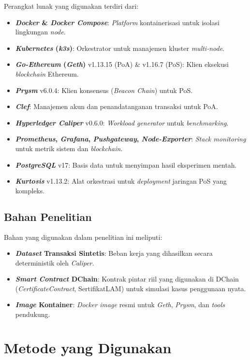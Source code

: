 Perangkat lunak yang digunakan terdiri dari:
\begin{itemize}
    \item \textbf{\textit{Docker} \& \textit{Docker Compose}}: \textit{Platform} kontainerisasi untuk isolasi lingkungan \textit{node}.
    \item \textbf{\textit{Kubernetes} (\textit{k3s})}: Orkestrator untuk manajemen kluster \textit{multi-node}.
    \item \textbf{\textit{Go-Ethereum} (\textit{Geth})} v1.13.15 (PoA) \& v1.16.7 (PoS): Klien eksekusi \textit{blockchain} Ethereum.
    \item \textbf{\textit{Prysm}} v6.0.4: Klien konsensus (\textit{Beacon Chain}) untuk PoS.
    \item \textbf{\textit{Clef}}: Manajemen akun dan penandatanganan transaksi untuk PoA.
    \item \textbf{\textit{Hyperledger Caliper}} v0.6.0: \textit{Workload generator} untuk \textit{benchmarking}.
    \item \textbf{\textit{Prometheus}, \textit{Grafana}, \textit{Pushgateway}, \textit{Node-Exporter}}: \textit{Stack monitoring} untuk metrik sistem dan \textit{blockchain}.
    \item \textbf{\textit{PostgreSQL}} v17: Basis data untuk menyimpan hasil eksperimen mentah.
    \item \textbf{\textit{Kurtosis}} v1.13.2: Alat orkestrasi untuk \textit{deployment} jaringan PoS yang kompleks.
\end{itemize}

\subsection{Bahan Penelitian}
Bahan yang digunakan dalam penelitian ini meliputi:
\begin{itemize}
    \item \textbf{\textit{Dataset} Transaksi Sintetis}: Beban kerja yang dihasilkan secara deterministik oleh \textit{Caliper}.
    \item \textbf{\textit{Smart Contract} DChain}: Kontrak pintar riil yang digunakan di DChain (\textit{CertificateContract}, SertifikatLAM) untuk simulasi kasus penggunaan nyata.
    \item \textbf{\textit{Image} Kontainer}: \textit{Docker image} resmi untuk \textit{Geth}, \textit{Prysm}, dan \textit{tools} pendukung.
\end{itemize}

\section{Metode yang Digunakan}

